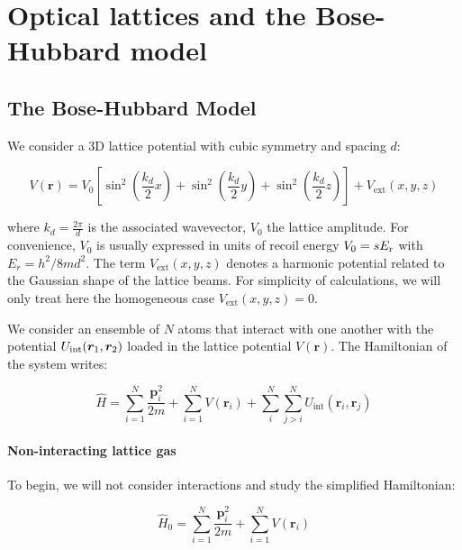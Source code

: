 \chapter{Optical lattices and the Bose-Hubbard model}


\label{sec:chapter_2}

\section{The Bose-Hubbard Model}

We consider a 3D lattice potential with cubic symmetry and spacing $d$:

\begin{equation}
    V(\bm{r})=V_{0}\left[\sin ^{2}\left(\frac{k_{d}}{2} x\right)+\sin ^{2}\left(\frac{k_{d}}{2} y\right)+\sin ^{2}\left(\frac{k_{d}}{2} z\right)\right] + V_{\mathrm{ext}} (x,y,z)
\end{equation}

\noindent where $k_d=\frac{2 \pi}{d}$ is the associated wavevector, $V_0$ the lattice amplitude. For convenience, $V_0$ is usually expressed in units of recoil energy $V_0 = s E_{\rm{r}}$ with $E_r=h^2/ 8 m d^2$. The term $V_{\mathrm{ext}} (x,y,z)$ denotes a harmonic potential related to the Gaussian shape of the lattice beams. For simplicity of calculations, we will only treat here the homogeneous case $V_{\mathrm{ext}} (x,y,z)=0$.

We consider an ensemble of $N$ atoms that interact with one another with the potential $U_{\rm{int}} ( \bm{r}_1, \bm{r}_2)$ loaded in the lattice potential $V(\bm{r})$. The Hamiltonian of the system writes:

\begin{equation}
    \hat{H}=\sum_{i=1}^{N} \frac{\bm{p}_{i}^{2}}{2 m}+\sum_{i=1}^{N} V\left(\bm{r}_{i}\right) + \sum_{i}^{N} \sum_{j>i}^{N} U_{\text{int}}\left(\bm{r}_{i}, \bm{r}_{j}\right)
    \label{eq:H_lattice_full}
\end{equation}

\subsubsection{Non-interacting lattice gas}

To begin, we will not consider interactions and study the simplified Hamiltonian:

\begin{equation}
    \hat{H}_0=\sum_{i=1}^{N} \frac{\bm{p}_{i}^{2}}{2 m}+\sum_{i=1}^{N} V\left(\bm{r}_{i}\right)
\end{equation}

